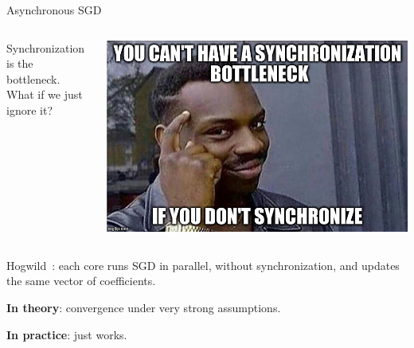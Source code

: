 \documentclass[10pt]{beamer}
\let\oldparencite=\parencite
\renewcommand{\parencite}[1]{\textcolor[rgb]{1.,.9,.9}{\oldparencite{#1}}}
\begin{document}
\begin{frame}{Asynchronous SGD}

\begin{columns}
\begin{column}{0.5\textwidth}  %
Synchronization is the bottleneck. \\

\vspace{1em}{\Large\faLightbulbO~}What if we just ignore it?
\end{column}
\begin{column}{0.5\textwidth}  %
\begin{center}
\includegraphics[width=\linewidth]{img/synchronization}
\end{center}
\end{column}
\end{columns}

\pause
Hogwild~\parencite{hogwild2011}: each core runs SGD in parallel, without synchronization, and updates the same vector of coefficients.

{\bfseries In theory}: convergence under very strong assumptions.

{\bfseries In practice}: just works.

\end{frame}
\end{document}
